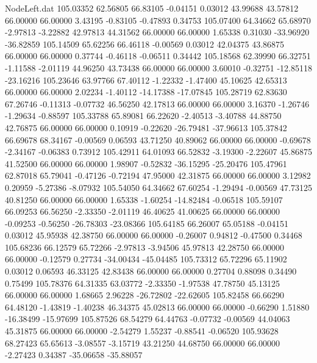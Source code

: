 \begin{filecontents}{NodeLeft.dat}
 105.03352   62.56805   66.83105    -0.04151    0.03012   43.99688   43.57812   66.00000   66.00000    3.43195   -0.83105   -0.47893    0.34753
 105.07400   64.34662   65.68970    -2.97813   -3.22882   42.97813   44.31562   66.00000   66.00000    1.65338    0.31030  -33.96920  -36.82859
 105.14509   65.62256   66.46118    -0.00569    0.03012   42.04375   43.86875   66.00000   66.00000    0.37744   -0.46118   -0.06511    0.34442
 105.18568   62.39990   66.32751    -1.11588   -2.01119   44.96250   43.73438   66.00000   66.00000    3.60010   -0.32751  -12.85118  -23.16216
 105.23646   63.97766   67.40112    -1.22332   -1.47400   45.10625   42.65313   66.00000   66.00000    2.02234   -1.40112  -14.17388  -17.07845
 105.28719   62.83630   67.26746    -0.11313   -0.07732   46.56250   42.17813   66.00000   66.00000    3.16370   -1.26746   -1.29634   -0.88597
 105.33788   65.89081   66.22620    -2.40513   -3.40788   44.88750   42.76875   66.00000   66.00000    0.10919   -0.22620  -26.79481  -37.96613
 105.37842   66.69678   68.34167    -0.00569    0.06593   43.71250   40.89062   66.00000   66.00000   -0.69678   -2.34167   -0.06383    0.73912
 105.42911   64.01093   66.52832    -3.19300   -2.22607   45.86875   41.52500   66.00000   66.00000    1.98907   -0.52832  -36.15295  -25.20476
 105.47961   62.87018   65.79041    -0.47126   -0.72194   47.95000   42.31875   66.00000   66.00000    3.12982    0.20959   -5.27386   -8.07932
 105.54050   64.34662   67.60254    -1.29494   -0.00569   47.73125   40.81250   66.00000   66.00000    1.65338   -1.60254  -14.82484   -0.06518
 105.59107   66.09253   66.56250    -2.33350   -2.01119   46.40625   41.00625   66.00000   66.00000   -0.09253   -0.56250  -26.78303  -23.08366
 105.64185   66.26007   65.05188    -0.04151    0.03012   45.95938   42.38750   66.00000   66.00000   -0.26007    0.94812   -0.47500    0.34468
 105.68236   66.12579   65.72266    -2.97813   -3.94506   45.97813   42.28750   66.00000   66.00000   -0.12579    0.27734  -34.00434  -45.04485
 105.73312   65.72296   65.11902     0.03012    0.06593   46.33125   42.83438   66.00000   66.00000    0.27704    0.88098    0.34490    0.75499
 105.78376   64.31335   63.03772    -2.33350   -1.97538   47.78750   45.13125   66.00000   66.00000    1.68665    2.96228  -26.72802  -22.62605
 105.82458   66.66290   64.48120    -1.43819   -1.40238   46.34375   45.02813   66.00000   66.00000   -0.66290    1.51880  -16.38499  -15.97699
 105.87526   68.54279   64.44763    -0.07732   -0.00569   44.04063   45.31875   66.00000   66.00000   -2.54279    1.55237   -0.88541   -0.06520
 105.93628   68.27423   65.65613    -3.08557   -3.15719   43.21250   44.68750   66.00000   66.00000   -2.27423    0.34387  -35.06658  -35.88057

\end{filecontents}
